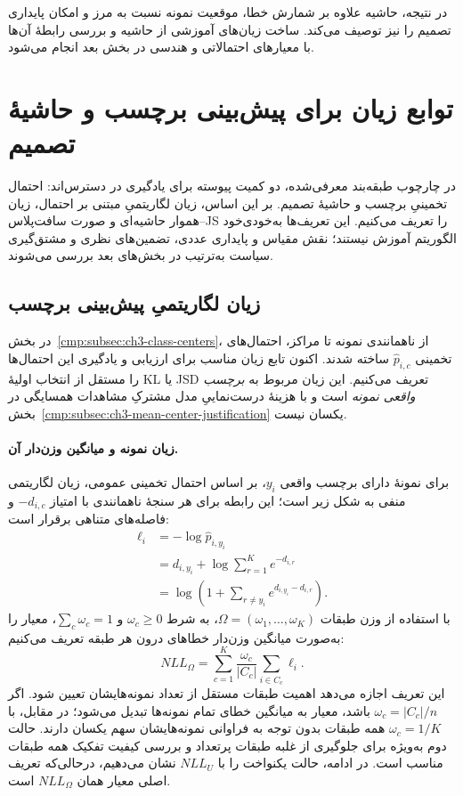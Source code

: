 در نتیجه، حاشیه علاوه بر شمارش خطا،
موقعیت نمونه نسبت به مرز و امکان پایداری تصمیم
را نیز توصیف می‌کند. ساخت زیان‌های آموزشی از حاشیه
و بررسی رابطهٔ آن‌ها با معیارهای احتمالاتی و هندسی
در بخش بعد انجام می‌شود.


\section{توابع زیان برای پیش‌بینی برچسب و حاشیهٔ تصمیم}
\label{cmp:sec:ch3-learning-objectives}
در چارچوب طبقه‌بند معرفی‌شده، دو کمیت پیوسته
برای یادگیری در دسترس‌اند: احتمال تخمینیِ برچسب
و حاشیهٔ تصمیم. بر این اساس، زیان
لگاریتمیِ مبتنی بر احتمال، زیان هموار
حاشیه‌ای و صورت سافت‌پلاس--JS را تعریف می‌کنیم.
این تعریف‌ها به‌خودی‌خود الگوریتم آموزش نیستند؛
نقش مقیاس و پایداری عددی، تضمین‌های نظری
و مشتق‌گیری سیاست به‌ترتیب در بخش‌های بعد بررسی می‌شوند.

\subsection{زیان لگاریتمیِ پیش‌بینی برچسب}
\label{cmp:sec:ch3-NLL}
در بخش~\ref{cmp:subsec:ch3-class-centers}،
از ناهمانندی نمونه تا مراکز، احتمال‌های تخمینی
$\widehat p_{i,c}$ ساخته شدند. اکنون تابع زیان
مناسب برای ارزیابی و یادگیری این احتمال‌ها را
مستقل از انتخاب اولیهٔ KL یا JSD تعریف می‌کنیم.
این زیان مربوط به \emph{برچسب واقعی نمونه} است
و با هزینهٔ درست‌نماییِ مدل مشترکِ مشاهدات همسایگی
در بخش~\ref{cmp:subsec:ch3-mean-center-justification}
یکسان نیست.

\paragraph{زیان نمونه و میانگین وزن‌دار آن.}
برای نمونهٔ دارای برچسب واقعی $y_i$، بر اساس احتمال تخمینی عمومی، زیان لگاریتمی منفی به شکل زیر است؛ این رابطه برای هر سنجهٔ ناهمانندی با امتیاز $-d_{i,c}$ و فاصله‌های متناهی برقرار است:
\begin{equation}\label{cmp:eq:ch3-NLL-sample}
\begin{aligned}
\ell_i
&=-\log\widehat p_{i,y_i}\\
&=d_{i,y_i}+\log\sum_{r=1}^{K}e^{-d_{i,r}}\\
&=\log\left(1+\sum_{r\ne y_i}e^{d_{i,y_i}-d_{i,r}}\right).
\end{aligned}
\end{equation}
با استفاده از وزن طبقات $\Omega=(\omega_1,\ldots,\omega_K)$، به شرط $\omega_c\ge0$ و $\sum_c\omega_c=1$، معیار را به‌صورت میانگین وزن‌دار خطاهای درون هر طبقه تعریف می‌کنیم:
\begin{equation}\label{cmp:eq:ch3-NLL-balanced}
\boxed{
NLL_{\Omega}=\sum_{c=1}^{K}\frac{\omega_c}{|C_c|}
\sum_{i\in C_c}\ell_i.}
\end{equation}
این تعریف اجازه می‌دهد اهمیت طبقات مستقل از تعداد نمونه‌هایشان تعیین شود. اگر $\omega_c=|C_c|/n$ باشد، معیار به میانگین خطای تمام نمونه‌ها تبدیل می‌شود؛ در مقابل، با $\omega_c=1/K$ همه طبقات بدون توجه به فراوانی نمونه‌هایشان سهم یکسان دارند. حالت دوم به‌ویژه برای جلوگیری از غلبه طبقات پرتعداد و بررسی کیفیت تفکیک همه طبقات مناسب است. در ادامه، حالت یکنواخت را با $NLL_U$ نشان می‌دهیم، درحالی‌که تعریف اصلی معیار همان $NLL_\Omega$ است.

